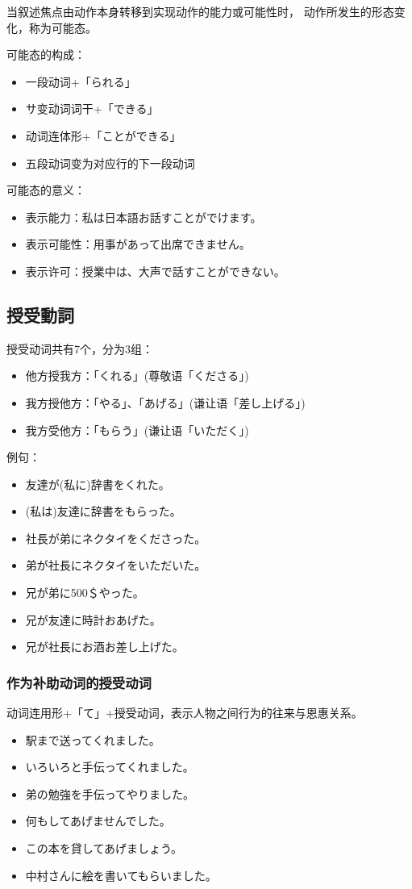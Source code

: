 当叙述焦点由动作本身转移到实现动作的能力或可能性时，
动作所发生的形态变化，称为可能态。

可能态的构成：
\begin{itemize}
  \item 一段动词+「られる」
  \item サ变动词词干+「できる」
  \item 动词连体形+「ことができる」
  \item 五段动词变为对应行的下一段动词
\end{itemize}

可能态的意义：
\begin{itemize}
  \item 表示能力：私は日本語お話すことがでけます。
  \item 表示可能性：用事があって出席できません。
  \item 表示许可：授業中は、大声で話すことができない。
\end{itemize}


\subsection{授受動詞}%

授受动词共有7个，分为3组：
\begin{itemize}
  \item 他方授我方：「くれる」(尊敬语「くださる」)
  \item 我方授他方：「やる」、「あげる」(谦让语「差し上げる」)
  \item 我方受他方：「もらう」(谦让语「いただく」)
\end{itemize}

例句：
\begin{itemize}
  \item 友達が(私に)辞書をくれた。
  \item (私は)友達に辞書をもらった。
  \item 社長が弟にネクタイをくださった。
  \item 弟が社長にネクタイをいただいた。
  \item 兄が弟に500＄やった。
  \item 兄が友達に時計おあげた。
  \item 兄が社長にお酒お差し上げた。
\end{itemize}


\subsubsection{作为补助动词的授受动词}%

动词连用形+「て」+授受动词，表示人物之间行为的往来与恩惠关系。
\begin{itemize}
  \item 駅まで送ってくれました。
  \item いろいろと手伝ってくれました。
  \item 弟の勉強を手伝ってやりました。
  \item 何もしてあげませんでした。
  \item この本を貸してあげましょう。
  \item 中村さんに絵を書いてもらいました。
\end{itemize}



